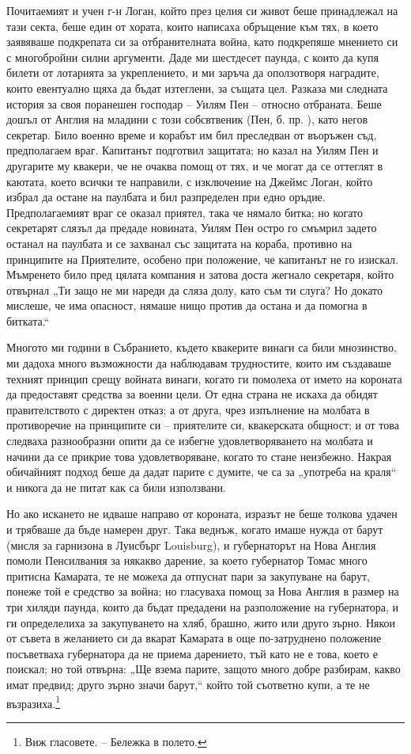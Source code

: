 \documentclass[12pt]{book}
\begin{document}
Почитаемият и учен г-н Логан, който през целия си живот беше принадлежал на тази секта, беше един от хората, които написаха обръщение към тях, в което заявяваше подкрепата си за отбранителната война, като подкрепяше мнението си с многобройни силни аргументи. Даде ми шестдесет паунда, с които да купя билети от лотарията за укреплението, и ми заръча да оползотворя наградите, които евентуално щяха да бъдат изтеглени, за същата цел. Разказа ми следната история за своя поранешен господар – Уилям Пен – относно отбраната. Беше дошъл от Англия на младини с този собсвтвеник (Пен, б. пр. ), като негов секретар. Било военно време и корабът им бил преследван от въоръжен съд, предполагаем враг. Капитанът подготвил защитата; но казал на Уилям Пен и другарите му квакери, че не очаква помощ от тях, и че могат да се оттеглят в каютата, което всички те направили, с изключение на Джеймс Логан, който избрал да остане на паулбата и бил разпределен при едно оръдие. Предполагаемият враг се оказал приятел, така че нямало битка; но когато секретарят слязъл да предаде новината, Уилям Пен остро го смъмрил задето останал на паулбата и се захванал със защитата на кораба, противно на принципите на Приятелите, особено при положение, че капитанът не го изискал. Мъмренето било пред цялата компания и затова доста жегнало секретаря, който отвърнал „Ти защо не ми нареди да сляза долу, като съм ти слуга? Но докато мислеше, че има опасност, нямаше нищо против да остана и да помогна в битката.“

Многото ми години в Събранието, където квакерите винаги са били мнозинство, ми дадоха много възможности да наблюдавам трудностите, които им създаваше техният принцип срещу войната винаги, когато ги помолеха от името на короната да предоставят средства за военни цели. От една страна не искаха да обидят правителството с директен отказ; а от друга, чрез изпълнение на молбата в противоречие на принципите си – приятелите си, квакерската общност; и от това следваха разнообразни опити да се избегне удовлетворяването на молбата и начини да се прикрие това удовлетворяване, когато то стане неизбежно. Накрая обичайният подход беше да дадат парите с думите, че са за „употреба на краля“ и никога да не питат как са били използвани.

Но ако искането не идваше направо от короната, изразът не беше толкова удачен и трябваше да бъде намерен друг. Така веднъж, когато имаше нужда от барут (мисля за гарнизона в Луисбърг Louisburg), и губернаторът на Нова Англия помоли Пенсилвания за някакво дарение, за което губернатор Томас много притисна Камарата, те не можеха да отпуснат пари за закупуване на барут, понеже той е средство за война; но гласуваха помощ за Нова Англия в размер на три хиляди паунда, които да бъдат предадени на разположение на губернатора, и ги определелиха за закупуването на хляб, брашно, жито или друго зърно. Някои от съвета в желанието си да вкарат Камарата в още по-затруднено положение посъветваха губернатора да не приема дарението, тъй като не е това, което е поискал; но той отвърна: „Ще взема парите, защото много добре разбирам, какво имат предвид; друго зърно значи барут,“ който той съответно купи, а те не възразиха.\footnote{Виж гласовете. -- Бележка в полето.}
\end{document}
